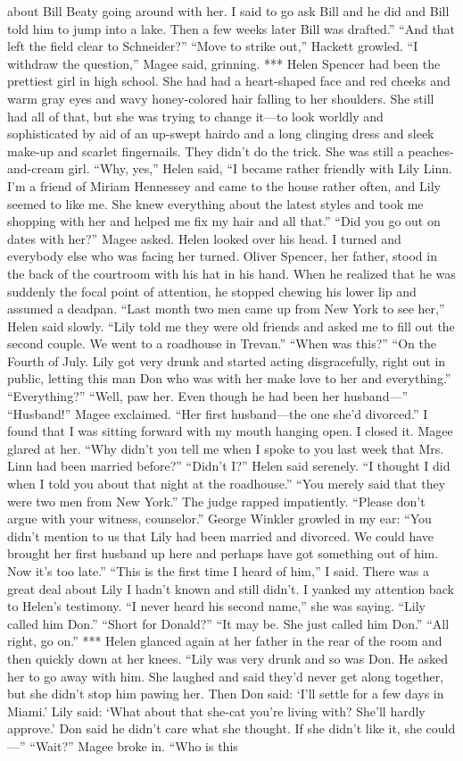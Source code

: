 \documentclass{novel}
\begin{document}
about Bill Beaty going around with her. I said to go ask Bill and he did and Bill told him to jump into a lake. Then a few weeks later Bill was drafted.” “And that left the field clear to Schneider?” “Move to strike out,” Hackett growled. “I withdraw the question,” Magee said, grinning. *** Helen Spencer had been the prettiest girl in high school. She had had a heart-shaped face and red cheeks and warm gray eyes and wavy honey-colored hair falling to her shoulders. She still had all of that, but she was trying to change it—to look worldly and sophisticated by aid of an up-swept hairdo and a long clinging dress and sleek make-up and scarlet fingernails. They didn’t do the trick. She was still a peaches-and-cream girl. “Why, yes,” Helen said, “I became rather friendly with Lily Linn. I’m a friend of Miriam Hennessey and came to the house rather often, and Lily seemed to like me. She knew everything about the latest styles and took me shopping with her and helped me fix my hair and all that.” “Did you go out on dates with her?” Magee asked. Helen looked over his head. I turned and everybody else who was facing her turned. Oliver Spencer, her father, stood in the back of the courtroom with his hat in his hand. When he realized that he was suddenly the focal point of attention, he stopped chewing his lower lip and assumed a deadpan. “Last month two men came up from New York to see her,” Helen said slowly. “Lily told me they were old friends and asked me to fill out the second couple. We went to a roadhouse in Trevan.” “When was this?” “On the Fourth of July. Lily got very drunk and started acting disgracefully, right out in public, letting this man Don who was with her make love to her and everything.” “Everything?” “Well, paw her. Even though he had been her husband—” “Husband!” Magee exclaimed. “Her first husband—the one she’d divorced.” I found that I was sitting forward with my mouth hanging open. I closed it. Magee glared at her. “Why didn’t you tell me when I spoke to you last week that Mrs. Linn had been married before?” “Didn’t I?” Helen said serenely. “I thought I did when I told you about that night at the roadhouse.” “You merely said that they were two men from New York.” The judge rapped impatiently. “Please don’t argue with your witness, counselor.” George Winkler growled in my ear: “You didn’t mention to us that Lily had been married and divorced. We could have brought her first husband up here and perhaps have got something out of him. Now it’s too late.” “This is the first time I heard of him,” I said. There was a great deal about Lily I hadn’t known and still didn’t. I yanked my attention back to Helen’s testimony. “I never heard his second name,” she was saying. “Lily called him Don.” “Short for Donald?” “It may be. She just called him Don.” “All right, go on.” *** Helen glanced again at her father in the rear of the room and then quickly down at her knees. “Lily was very drunk and so was Don. He asked her to go away with him. She laughed and said they’d never get along together, but she didn’t stop him pawing her. Then Don said: ‘I’ll settle for a few days in Miami.’ Lily said: ‘What about that she-cat you’re living with? She’ll hardly approve.’ Don said he didn’t care what she thought. If she didn’t like it, she could—” “Wait?” Magee broke in. “Who is this 
\end{document}
